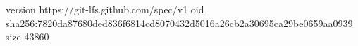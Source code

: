 version https://git-lfs.github.com/spec/v1
oid sha256:7820da87680ded836f6814cd8070432d5016a26cb2a30695ca29be0659aa0939
size 43860
